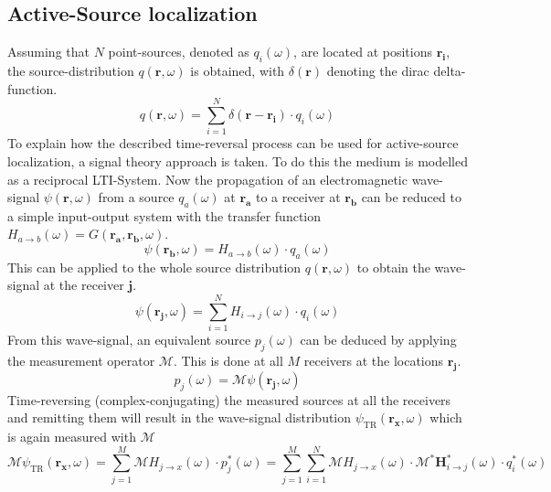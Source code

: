 \subsection{Active-Source localization}
Assuming that \(N\) point-sources, denoted as \(q_i(\omega)\), are located at positions \(\bm{r_i}\), the source-distribution \(q(\bm{r}, \omega)\) is obtained, with \(\delta(\bm{r}) \) denoting the dirac delta-function.
\begin{equation}
    q(\bm{r}, \omega) = \sum_{i=1}^{N} \delta(\bm{r} - \bm{r_i}) \cdot q_i(\omega)
\end{equation}
To explain how the described time-reversal process can be used for active-source localization, a signal theory approach is taken.
To do this the medium is modelled as a reciprocal LTI-System.
Now the propagation of an electromagnetic wave-signal \(\psi(\bm{r}, \omega )\) from a source \(q_a(\omega )\) at \(\bm{r_a}\) to a receiver at \(\bm{r_b}\) can be reduced to a simple input-output system with the transfer function \(H_{a\rightarrow b}(\omega) = G(\bm{r_a}, \bm{r_b}, \omega)\).
\begin{equation}
    \psi(\bm{r_b}, \omega) = H_{a\rightarrow b}(\omega) \cdot q_a(\omega)
\end{equation}
This can be applied to the whole source distribution \(q(\bm{r}, \omega)\) to obtain the wave-signal at the receiver \(\bm{j}\).
\begin{equation}
    \psi(\bm{r_j}, \omega) = \sum_{i=1}^{N} H_{i\rightarrow j}(\omega) \cdot q_i(\omega)
\end{equation}
From this wave-signal, an equivalent source \(p_j(\omega)\) can be deduced by applying the measurement operator \(\mathcal{M}\). This is done at all \(M\) receivers at the locations \(\bm{r_j}\).  
\begin{equation}
    p_j(\omega) = \mathcal{M} \psi(\bm{r_j}, \omega)
\end{equation}
Time-reversing (complex-conjugating) the measured sources at all the receivers and remitting them will result in the wave-signal distribution \(\psi_{\text{TR}}(\bm{r_x}, \omega)\) which is again measured with \(\mathcal{M}\)
\begin{equation}\label{signal-time-reversal}
    \mathcal{M} \psi_{\text{TR}}(\bm{r_x}, \omega) = \sum_{j=1}^{M} \mathcal{M} H_{j\rightarrow x}(\omega ) \cdot p_j^*(\omega) = \sum_{j=1}^{M} \sum_{i=1}^{N} \mathcal{M} H_{j\rightarrow x}(\omega) \cdot \mathcal{M}^* \bm{H}^*_{i\rightarrow j}(\omega) \cdot q^*_i(\omega)
\end{equation}

